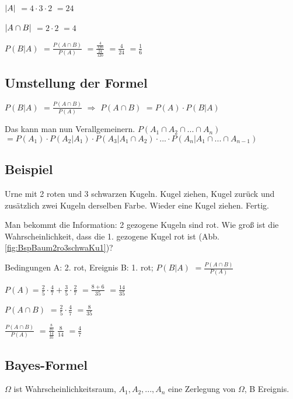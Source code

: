 $ \left\vert A \right\vert $
$=4\cdot 3\cdot 2$
$=24$

$ \left\vert A\cap B \right\vert $
$=2\cdot 2$
$=4$

$P(B|A) $ 
$=\frac{P(A\cap B)}{P(A)}$
$= \frac{\frac{4}{120}}{\frac{24}{120}}$
$=\frac{4}{24} $
$=\frac{1}{6}$

\subsection{Umstellung der Formel}
$P(B|A) $ 
$=\frac{P(A\cap B)}{P(A)}$
$\Rightarrow$
$P(A\cap B) $
$=P(A) \cdot P(B|A)$ 

Das kann man nun Verallgemeinern. 
$P(A_1 \cap A_2 \cap ... \cap A_n)$
$= P(A_1) \cdot P(A_2 | A_1) \cdot P(A_3 | A_1 \cap A_2) \cdot ... \cdot P(A_n | A_1 \cap ... \cap A_{n-1})$

\subsection{Beispiel}
Urne mit 2 roten und 3 schwarzen Kugeln. Kugel ziehen, Kugel zurück und zusätzlich zwei Kugeln derselben Farbe. Wieder eine Kugel ziehen. Fertig. 

Man bekommt die Information: 2 gezogene Kugeln sind rot. Wie groß ist die Wahrscheinlichkeit, dass die 1. gezogene Kugel rot ist (Abb. \ref{fig:BspBaum2ro3schwaKu1})?

Bedingungen A: 2. rot, Ereignis B: 1. rot; 
$P(B|A) $
$=\frac{P(A\cap B)}{P(A)}$

$P(A) = \frac{2}{5} \cdot \frac{4}{7} + \frac{3}{5} \cdot \frac{2}{7}$
$=\frac{8+6}{35} $
$=\frac{14}{35}$

$P(A\cap B) $
$=\frac{2}{5} \cdot \frac{4}{7}$
$=\frac{8}{35}$

$\frac{P(A\cap B)}{P(A)}$
$=\frac{\frac{8}{35}}{\frac{14}{35}}$
$\frac{8}{14}$
$=\frac{4}{7}$

\subsection{Bayes-Formel}
$\Omega$ ist Wahrscheinlichkeitsraum, $A_1, A_2, ..., A_n$ eine Zerlegung von $\Omega$, B Ereignis. 


